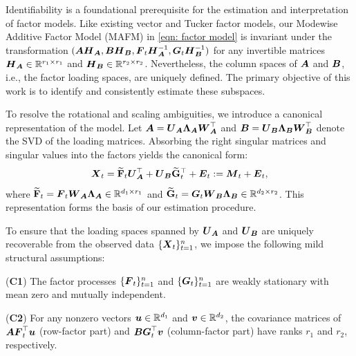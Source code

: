 \documentclass[11pt,letterpaper]{article}
\newcommand{\bfm}[1]{\ensuremath{\boldsymbol{#1}}} %
\def\bu{\bfm u}   \def\bU{\bfm U}  \def\UU{\mathbb{U}}
\def\bv{\bfm v}   \def\bV{\bfm V}  \def\VV{\mathbb{V}}
\theoremstyle{definition}
\newcommand{\cano}[1]{\widetilde{\mathbf{#1}}}
\begin{document}
Identifiability is a foundational prerequisite for the estimation and interpretation of factor models. Like existing vector and Tucker factor models, our Modewise Additive Factor Model (MAFM) in \eqref{eqn: factor model} is invariant under the transformation
$(\bA\bH_{\bA}, \bB\bH_{\bB}, \bF_t\bH_{\bA}^{-1}, \bG_t\bH_{\bB}^{-1})$ for any invertible matrices $\bH_{\bA} \in \RR^{r_1 \times r_1}$ and $\bH_{\bB} \in \RR^{r_2 \times r_2}$. Nevertheless, the column spaces of $\bA$ and $\bB$, i.e., the factor loading spaces, are uniquely defined. The primary objective of this work is to identify and consistently estimate these subspaces.

To resolve the rotational and scaling ambiguities, we introduce a canonical representation of the model. Let $\bA = \bU_{\bA}\bLambda_{\bA}\bW_{\bA}^\top$ and $\bB = \bU_{\bB}\bLambda_{\bB}\bW_{\bB}^\top$ denote the SVD of the loading matrices. Absorbing the right singular matrices and singular values into the factors yields the canonical form:
\begin{equation}
\label{eqn: cano factor model}
\bX_t = \cano F_t \bU_{\bA}^\top + \bU_{\bB} \cano G_t^\top + \bE_t:=\bM_t+\bE_t,
\end{equation}
where $\cano F_t = \bF_t \bW_{\bA}\bLambda_{\bA} \in \RR^{d_1 \times r_1}$ and $\cano G_t = \bG_t \bW_{\bB}\bLambda_{\bB} \in \RR^{d_2 \times r_2}$. This representation forms the basis of our estimation procedure.



To ensure that the loading spaces spanned by $\bU_{\bA}$ and $\bU_{\bB}$ are uniquely recoverable from the observed data $\{\bX_t\}_{t=1}^n$, we impose the following mild structural assumptions:

(\textbf{C1}) The factor processes $\{\bF_t\}_{t=1}^n$ and $\{\bG_t\}_{t=1}^n$ are weakly stationary with mean zero and mutually independent.

(\textbf{C2}) For any nonzero vectors $\bu \in \RR^{d_1}$ and $\bv \in \RR^{d_2}$, the covariance matrices of $\bA\bF_t^\top\bu$ (row-factor part) and $\bB\bG_t^\top\bv$ (column-factor part) have ranks $r_1$ and $r_2$, respectively. 
\end{document}
